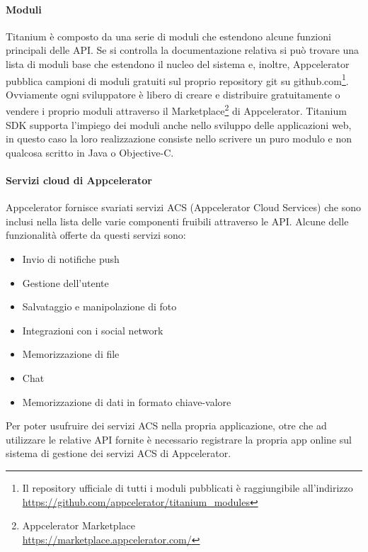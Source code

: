             \paragraph{Moduli}
                Titanium è composto da una serie di moduli che estendono alcune
                funzioni principali delle API. Se si controlla la documentazione
                relativa si può trovare una lista di moduli base che estendono
                il nucleo del sistema e, inoltre, Appcelerator pubblica
                campioni di moduli gratuiti sul proprio repository git su
                \mbox{github.com}\footnote{Il repository ufficiale di tutti i
                moduli pubblicati è raggiungibile all'indirizzo\\
                \url{https://github.com/appcelerator/titanium_modules}}.
                Ovviamente ogni sviluppatore è libero di creare e distribuire
                gratuitamente o vendere i proprio moduli attraverso il
                Marketplace\footnote{Appcelerator Marketplace\\
                \url{https://marketplace.appcelerator.com/}}
                di Appcelerator. Titanium SDK supporta l'impiego dei moduli
                anche nello sviluppo delle applicazioni web, in questo caso la
                loro realizzazione consiste nello scrivere un puro modulo
                \js{} e non qualcosa scritto in Java o Objective-C.

            \clearpage
            \paragraph{Servizi cloud di Appcelerator}
                Appcelerator fornisce svariati servizi ACS (Appcelerator Cloud
                Services) che sono inclusi nella lista delle varie componenti
                fruibili attraverso le API. Alcune delle funzionalità offerte da
                questi servizi sono:
                \begin{itemize}
                    \item Invio di notifiche push
                    \item Gestione dell'utente
                    \item Salvataggio e manipolazione di foto
                    \item Integrazioni con i social network
                    \item Memorizzazione di file
                    \item Chat
                    \item Memorizzazione di dati in formato chiave-valore
                \end{itemize}
                Per poter usufruire dei servizi ACS nella propria applicazione,
                otre che ad utilizzare le relative API fornite è necessario
                registrare la propria app online sul sistema di gestione dei
                servizi ACS di Appcelerator.

